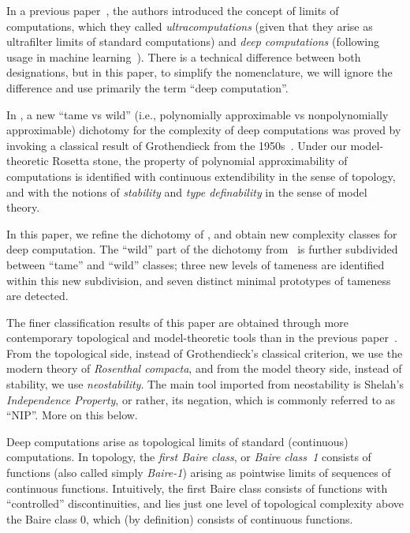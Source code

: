 In a previous paper~\cite{alva2024approximability}, the authors introduced the concept of limits of computations, which they called \emph{ultracomputations} (given that they arise as ultrafilter limits of standard computations) and \emph{deep computations} (following usage in machine learning~\cite{Bai:2019}).
There is a technical difference between both designations, but in this paper, to simplify the nomenclature, we will ignore the difference and use primarily the term ``deep computation''.

In \cite{alva2024approximability}, a new ``tame vs wild'' (i.e., polynomially approximable vs nonpolynomially approximable) dichotomy for the complexity of deep computations was proved by invoking a classical result of Grothendieck from the 1950s~\cite{Grothendieck:1952}.
Under our model-theoretic Rosetta stone, the property of polynomial approximability of computations is identified with continuous extendibility in the sense of topology, and with the notions of \emph{stability} and \emph{type definability} in the sense of model theory.

In this paper, we refine the dichotomy of \cite{alva2024approximability}, and obtain new complexity classes for deep computation.
The ``wild'' part of the dichotomy from~\cite{alva2024approximability} is further subdivided between ``tame'' and ``wild'' classes; three new levels of tameness are identified within this new subdivision, and seven distinct minimal prototypes of tameness are detected.

The finer classification results of this paper are obtained through more contemporary topological and model-theoretic tools than in the previous paper~\cite{alva2024approximability}. 
From the topological side, instead of Grothendieck's classical criterion, we use the modern theory of \emph{Rosenthal compacta}, and from the model theory side, instead of stability, we use \emph{neostability}.
The main tool imported from neostability is Shelah's \emph{Independence Property}, or rather, its negation, which is commonly referred to as ``NIP''.
More on this below.

Deep computations arise as topological limits of standard (continuous) computations.
In topology, the \emph{first Baire class}, or \emph{Baire class~1} consists of functions (also called simply \emph{Baire-1}) arising as pointwise limits of sequences of continuous functions.
Intuitively, the first Baire class consists of functions with ``controlled'' discontinuities, and lies just one level of topological complexity above the Baire class 0, which (by definition) consists of continuous functions.

